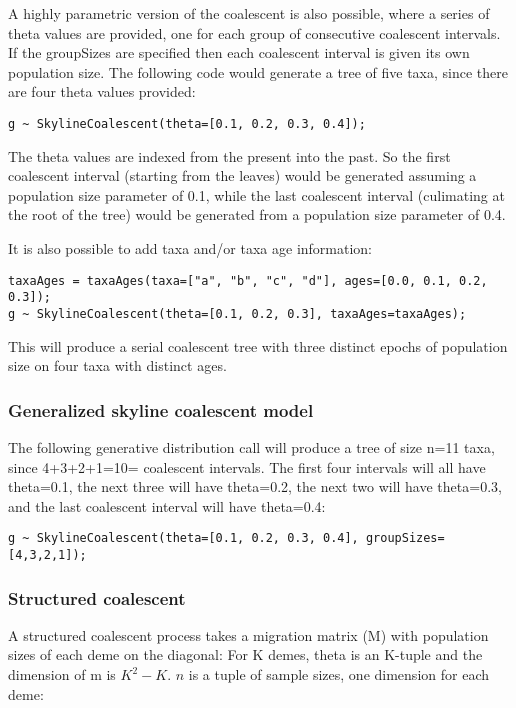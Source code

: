 \documentclass[oneside]{article}
\begin{document}
A highly parametric version of the coalescent is also possible, where
a series of theta values are provided, one for each group of consecutive coalescent intervals.
If the groupSizes are specified then each coalescent interval is given its
own population size.
The following code would generate a tree of five taxa, since there are four theta values provided:

\begin{verbatim}
g ~ SkylineCoalescent(theta=[0.1, 0.2, 0.3, 0.4]);
\end{verbatim}

The theta values are indexed from the present into the past.
So the first coalescent interval (starting from the leaves)
would be generated assuming a population size parameter of 0.1, while
the last coalescent interval (culimating at the root of the tree)
would be generated from a population size parameter of 0.4.

It is also possible to add taxa and/or taxa age information:

\begin{verbatim}
taxaAges = taxaAges(taxa=["a", "b", "c", "d"], ages=[0.0, 0.1, 0.2, 0.3]);
g ~ SkylineCoalescent(theta=[0.1, 0.2, 0.3], taxaAges=taxaAges);
\end{verbatim}

This will produce a serial coalescent tree with three distinct epochs
of population size on four taxa with distinct ages.

\subsubsection{Generalized skyline coalescent model}

The following generative distribution call will produce a tree of size
n=11 taxa, since 4+3+2+1=10= coalescent intervals.
The first four intervals will all have theta=0.1, the next three will
have theta=0.2, the next two will have theta=0.3, and the last
coalescent interval will have theta=0.4:

\begin{verbatim}
g ~ SkylineCoalescent(theta=[0.1, 0.2, 0.3, 0.4], groupSizes=[4,3,2,1]);
\end{verbatim}

\subsubsection{Structured coalescent}

A structured coalescent process takes a migration matrix (M) with
population sizes of each deme on the diagonal:
For K demes, theta is an K-tuple and the dimension of m is $K^2 -
K$. $n$ is a tuple of sample sizes, one dimension for each deme:
\end{document}
